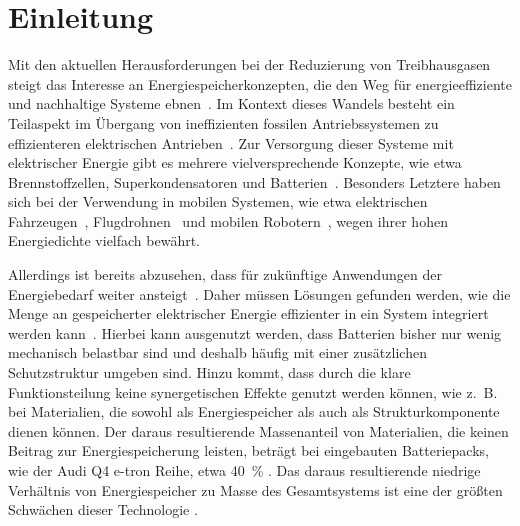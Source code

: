 \chapter[Einleitung]{\label{sec:Einleitung}Einleitung}
Mit den aktuellen Herausforderungen bei der Reduzierung von Treibhausgasen~\cite{MacDowell2017} steigt das Interesse an Energiespeicherkonzepten, die den Weg für energieeffiziente und nachhaltige Systeme ebnen~\cite{Owusu2016}. Im Kontext dieses Wandels besteht ein Teilaspekt im Übergang von ineffizienten fossilen Antriebssystemen zu effizienteren elektrischen Antrieben~\cite{Sugiyama2012}. Zur Versorgung dieser Systeme mit elektrischer Energie gibt es mehrere vielversprechende Konzepte, wie etwa Brennstoffzellen, Superkondensatoren und Batterien~\cite{Winter2004,Hemmati2016,Salkuti2023}. Besonders Letztere haben sich bei der Verwendung in mobilen Systemen, wie etwa elektrischen Fahrzeugen~\cite{Huo2015,Donateo2015,Jochem2015,Kim2014,Orsi2016,Silva2011,Holdway2010,Sternberg2015,Ramachandran2015}, Flugdrohnen~\cite{VincentWong2015,Boukoberine2019,Pham2022,Wang2022} und mobilen Robotern~\cite{Hecht2023,Mikolajczyk2023,Ghobadpour2023,Wang2020}, wegen ihrer hohen Energiedichte vielfach bewährt.

Allerdings ist bereits abzusehen, dass für zukünftige Anwendungen der Energiebedarf weiter ansteigt~\cite{Foiadelli2018}. Daher müssen Lösungen gefunden werden, wie die Menge an gespeicherter elektrischer Energie effizienter in ein System integriert werden kann~\cite{VanMierlo2007,Xu2022}.
Hierbei kann ausgenutzt werden, dass Batterien bisher nur wenig mechanisch belastbar sind und deshalb häufig mit einer zusätzlichen Schutzstruktur umgeben sind. Hinzu kommt, dass durch die klare Funktionsteilung keine synergetischen Effekte genutzt werden können, wie z.~B. bei Materialien, die sowohl als Energiespeicher als auch als Strukturkomponente dienen können. Der daraus resultierende Massenanteil von Materialien, die keinen Beitrag zur Energiespeicherung leisten, beträgt bei eingebauten Batteriepacks, wie der Audi Q4 e-tron Reihe, etwa 40~\% \cite{Radu2021,Audi2022}. Das daraus resultierende niedrige Verhältnis von Energiespeicher zu Masse des Gesamtsystems ist eine der größten Schwächen dieser Technologie \cite{Armand2020,Schaefer2018,Cano2018,Goodenough2009}. %

